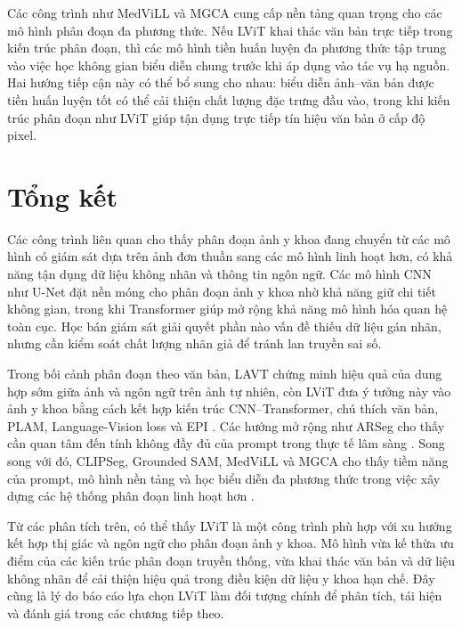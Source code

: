 Các công trình như MedViLL và MGCA cung cấp nền tảng quan trọng cho các mô hình phân đoạn đa phương thức. Nếu LViT khai thác văn bản trực tiếp trong kiến trúc phân đoạn, thì các mô hình tiền huấn luyện đa phương thức tập trung vào việc học không gian biểu diễn chung trước khi áp dụng vào tác vụ hạ nguồn. Hai hướng tiếp cận này có thể bổ sung cho nhau: biểu diễn ảnh--văn bản được tiền huấn luyện tốt có thể cải thiện chất lượng đặc trưng đầu vào, trong khi kiến trúc phân đoạn như LViT giúp tận dụng trực tiếp tín hiệu văn bản ở cấp độ pixel.

\section{Tổng kết}

Các công trình liên quan cho thấy phân đoạn ảnh y khoa đang chuyển từ các mô hình có giám sát dựa trên ảnh đơn thuần sang các mô hình linh hoạt hơn, có khả năng tận dụng dữ liệu không nhãn và thông tin ngôn ngữ. Các mô hình CNN như U-Net đặt nền móng cho phân đoạn ảnh y khoa nhờ khả năng giữ chi tiết không gian, trong khi Transformer giúp mở rộng khả năng mô hình hóa quan hệ toàn cục. Học bán giám sát giải quyết phần nào vấn đề thiếu dữ liệu gán nhãn, nhưng cần kiểm soát chất lượng nhãn giả để tránh lan truyền sai số.

Trong bối cảnh phân đoạn theo văn bản, LAVT chứng minh hiệu quả của dung hợp sớm giữa ảnh và ngôn ngữ trên ảnh tự nhiên, còn LViT đưa ý tưởng này vào ảnh y khoa bằng cách kết hợp kiến trúc CNN--Transformer, chú thích văn bản, PLAM, Language-Vision loss và EPI \cite{yang_lavt_2021,li_lvit_2023}. Các hướng mở rộng như ARSeg cho thấy cần quan tâm đến tính không đầy đủ của prompt trong thực tế lâm sàng \cite{Wang_Lin_Yan}. Song song với đó, CLIPSeg, Grounded SAM, MedViLL và MGCA cho thấy tiềm năng của prompt, mô hình nền tảng và học biểu diễn đa phương thức trong việc xây dựng các hệ thống phân đoạn linh hoạt hơn \cite{luddecke_image_2021,ren_grounded_2024,moon_multi-modal_2021,wang_multi-granularity_2022}.

Từ các phân tích trên, có thể thấy LViT là một công trình phù hợp với xu hướng kết hợp thị giác và ngôn ngữ cho phân đoạn ảnh y khoa. Mô hình vừa kế thừa ưu điểm của các kiến trúc phân đoạn truyền thống, vừa khai thác văn bản và dữ liệu không nhãn để cải thiện hiệu quả trong điều kiện dữ liệu y khoa hạn chế. Đây cũng là lý do báo cáo lựa chọn LViT làm đối tượng chính để phân tích, tái hiện và đánh giá trong các chương tiếp theo.